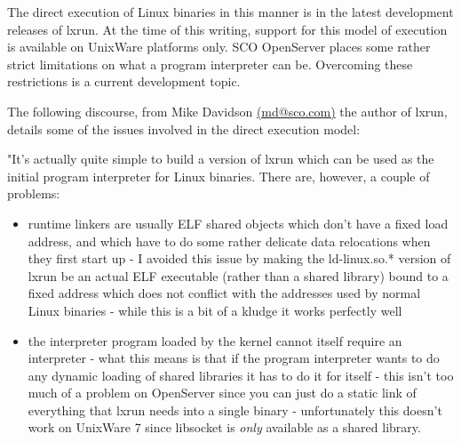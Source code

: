 \documentclass[letterpaper]{article}
\begin{document}
The direct execution of Linux binaries in this manner is in the latest 
development releases of lxrun. At the time of this writing, support for
this model of execution is available on UnixWare platforms only. SCO OpenServer
places some rather strict limitations on what a program interpreter can be.
Overcoming these restrictions is a current development topic.

The following discourse, from Mike Davidson
\url{(md@sco.com)} the author of lxrun, 
details some of the issues involved in the direct execution model:

"It's actually quite simple to build a version of lxrun which
can be used as the initial program interpreter for Linux binaries.
There are, however, a couple of problems:
\begin{itemize}
\item  runtime linkers are usually ELF shared objects
which don't have a fixed load address, and which have
to do some rather delicate data relocations when they
first start up - I avoided this issue by making the
ld-linux.so.* version of lxrun be an actual ELF executable
(rather than a shared library) bound to a fixed address
which does not conflict with the addresses used by normal
Linux binaries - while this is a bit of a kludge it works
perfectly well
\item  the interpreter program loaded by the kernel cannot itself
require an interpreter - what this means is that if the
program interpreter wants to do any dynamic loading of
shared libraries it has to do it for itself - this isn't
too much of a problem on OpenServer since you can just
do a static link of everything that lxrun needs into a
single binary - unfortunately this doesn't work on UnixWare 7
since libsocket is {\itshape only\/} available as a shared library.
\end{itemize}
\end{document}
